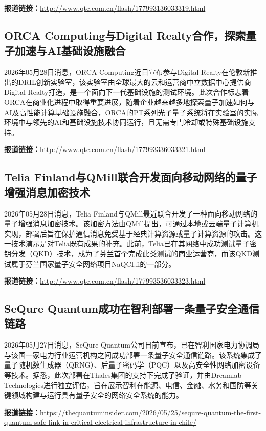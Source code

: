 \documentclass[12pt,a4paper]{ctexart}
\begin{document}
\noindent\textbf{报道链接：}\url{http://www.qtc.com.cn/flash/177993136033319.html}

\subsection{ ORCA Computing与Digital Realty合作，探索量子加速与AI基础设施融合 }

2026年05月28日消息，ORCA Computing近日宣布参与Digital Realty在伦敦新推出的DRIL创新实验室，该实验室由全球最大的云和运营商中立数据中心提供商Digital Realty打造，是一个面向下一代基础设施的测试环境。此次合作标志着ORCA在商业化进程中取得重要进展，随着企业越来越多地探索量子加速如何与AI及高性能计算基础设施融合，ORCA的PT系列光子量子系统将在实验室的实际环境中与领先的AI和基础设施技术协同运行，且无需专门冷却或特殊基础设施支持。

\noindent\textbf{报道链接：}\url{http://www.qtc.com.cn/flash/177993336033321.html}

\subsection{ Telia Finland与QMill联合开发面向移动网络的量子增强消息加密技术 }

2026年05月28日消息，Telia Finland与QMill最近联合开发了一种面向移动网络的量子增强消息加密技术。该加密方法由QMill提出，可通过本地或云端量子计算机实现，部署后旨在保护通信消息免受基于经典计算资源或量子计算资源的攻击。这一技术演示是对Telia既有成果的补充。此前，Telia已在其网络中成功测试量子密钥分发（QKD）技术，成为了芬兰首个完成此类测试的商业运营商，而该QKD测试属于芬兰国家量子安全网络项目NaQCI.fi的一部分。

\noindent\textbf{报道链接：}\url{http://www.qtc.com.cn/flash/177993536033323.html}

\subsection{ SeQure Quantum成功在智利部署一条量子安全通信链路 }

2026年05月27日消息，SeQure Quantum公司日前宣布，已在智利国家电力协调局与该国一家电力行业运营机构之间成功部署一条量子安全通信链路。该系统集成了量子随机数生成器（QRNG）、后量子密码学（PQC）以及高安全性网络加密设备等技术。据悉，此次部署在Thales集团的支持下完成了验证，并由Dreamlab Technologies进行独立评估，旨在展示智利在能源、电信、金融、水务和国防等关键领域构建与运行具有量子安全的网络安全系统的能力。

\noindent\textbf{报道链接：}\url{https://thequantuminsider.com/2026/05/25/sequre-quantum-the-first-quantum-safe-link-in-critical-electrical-infrastructure-in-chile/}
\end{document}
